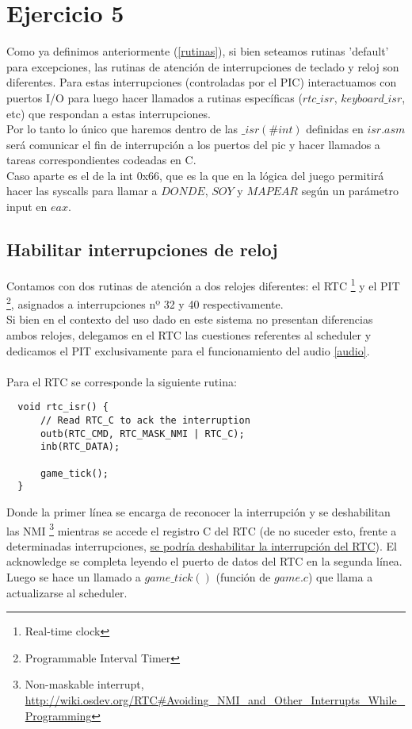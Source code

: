 \section{Ejercicio 5}
Como ya definimos anteriormente (\ref{rutinas}), si bien seteamos rutinas 'default' para excepciones, las rutinas de atención de interrupciones de teclado y reloj son diferentes.
Para estas interrupciones (controladas por el PIC) interactuamos con puertos I/O para luego hacer llamados a rutinas específicas ($rtc\_isr$, $keyboard\_isr$, etc) que respondan a estas interrupciones.
\\Por lo tanto lo único que haremos dentro de las $\_isr(\# int)$ definidas en $isr.asm$ será comunicar el fin de interrupción a los puertos del pic y hacer llamados a tareas correspondientes codeadas en C.
\\Caso aparte es el de la int 0x66, que es la que en la lógica del juego permitirá hacer las syscalls para llamar a $DONDE$, $SOY$ y $MAPEAR$ según un parámetro input en $eax$.

\subsection{Habilitar interrupciones de reloj}
Contamos con dos rutinas de atención a dos relojes diferentes: el RTC \footnote{Real-time clock } y el PIT \footnote{Programmable Interval Timer}, asignados a interrupciones nº 32 y 40 respectivamente. \\
Si bien en el contexto del uso dado en este sistema no presentan diferencias ambos relojes, delegamos en el RTC las cuestiones referentes al scheduler y dedicamos el PIT exclusivamente para el funcionamiento del audio \ref{audio}.
\\
\\
Para el RTC se corresponde la siguiente rutina:

\begin{lstlisting}
  void rtc_isr() {
      // Read RTC_C to ack the interruption
      outb(RTC_CMD, RTC_MASK_NMI | RTC_C);
      inb(RTC_DATA);

      game_tick();
  }
\end{lstlisting}

Donde la primer línea se encarga de reconocer la interrupción y se deshabilitan las NMI
\footnote{Non-maskable interrupt, \url{http://wiki.osdev.org/RTC\#Avoiding_NMI_and_Other_Interrupts_While_Programming}} mientras se accede el registro C del RTC (de no suceder esto, frente a determinadas interrupciones,
\href{http://wiki.osdev.org/RTC\#Interrupts_and_Register_C}{se podría deshabilitar la interrupción del RTC}). El acknowledge se completa leyendo el puerto de datos del RTC en la segunda línea. \\
Luego se hace un llamado a $game\_tick()$ (función de $game.c$) que llama a actualizarse al scheduler.



